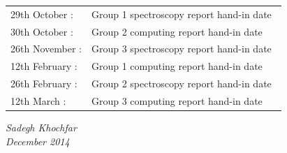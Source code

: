 \documentclass[12pt]{article}
\begin{document}
\begin{minipage}{18.0cm}
\begin{center}
\begin{tabular}{ll}
29th October :  & Group 1 spectroscopy report hand-in date\ \\
30th October :  & Group 2 computing report hand-in date\\
26th November : & Group 3 spectroscopy report hand-in date\\
12th February : & Group 1 computing report hand-in date\\
26th February : & Group 2 spectroscopy report hand-in date\\
12th March :    & Group 3 computing report hand-in date
\end{tabular}
\end{center}


\vspace*{2mm}
{\sl Sadegh Khochfar\\
December 2014}
\end{minipage}




\newpage
\end{document}
